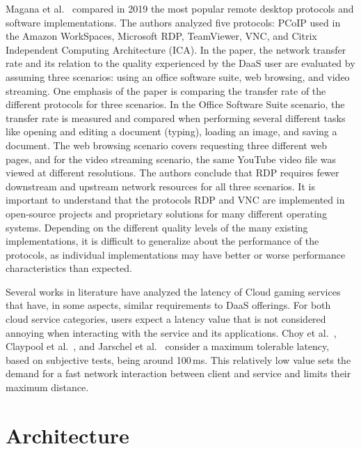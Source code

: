 \documentclass[runningheads]{llncs}
\begin{document}
Magana et al.~\cite{magana2019remote} compared in 2019 the most popular remote desktop protocols and software implementations. The authors analyzed five protocols: PCoIP used in the Amazon WorkSpaces, Microsoft RDP, TeamViewer, VNC, and Citrix Independent Computing Architecture (ICA). In the paper, the network transfer rate and its relation to the quality experienced by the DaaS user are evaluated by assuming three scenarios: using an office software suite, web browsing, and video streaming. One emphasis of the paper is comparing the transfer rate of the different protocols for three scenarios. In the Office Software Suite scenario, the transfer rate is measured and compared when performing several different tasks like opening and editing a document (typing), loading an image, and saving a document. The web browsing scenario covers requesting three different web pages, and for the video streaming scenario, the same YouTube video file was viewed at different resolutions. The authors conclude that RDP requires fewer downstream and upstream network resources for all three scenarios. It is important to understand that the protocols RDP and VNC are implemented in open-source projects and proprietary solutions for many different operating systems. Depending on the different quality levels of the many existing implementations, it is difficult to generalize about the performance of the protocols, as individual implementations may have better or worse performance characteristics than expected.

Several works in literature have analyzed the latency of Cloud gaming services that have, in some aspects, similar requirements to DaaS offerings. For both cloud service categories, users expect a latency value that is not considered annoying when interacting with the service and its applications. Choy et al.~\cite{ChoyWongSimonRosenberg2012}, Claypool et al.~\cite{claypool2010latency}, and Jarschel et al.~\cite{jarschel2011evaluation} consider a maximum tolerable latency, based on subjective tests, being around 100\,ms. This relatively low value sets the demand for a fast network interaction between client and service and limits their maximum distance. 



\section{Architecture}
\label{sec:RecommendDaaSarchitecture}
% 
\end{document}
